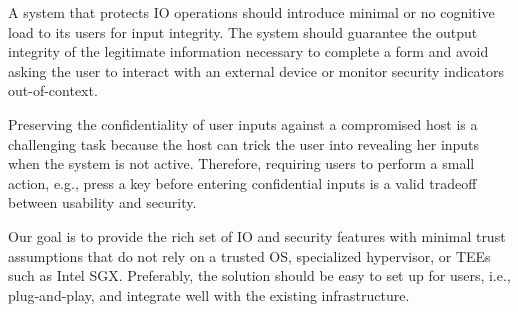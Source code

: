 A system that protects IO operations should introduce minimal or no cognitive load to its users for input integrity.
The system should guarantee the output integrity of the legitimate information necessary to complete a form and avoid asking the user to interact with an external device or monitor security indicators out-of-context.


 Preserving the confidentiality of user inputs against a compromised host is a challenging task because the host can trick the user into revealing her inputs when the system is not active. Therefore, requiring users to perform a small action, e.g., press a key before entering confidential inputs is a valid tradeoff between usability and security.


Our goal is to provide the rich set of IO and security features with minimal trust assumptions that do not rely on a trusted OS, specialized hypervisor, or TEEs such as Intel SGX. Preferably, the solution should be easy to set up for users, i.e., plug-and-play, and integrate well with the existing infrastructure.  
